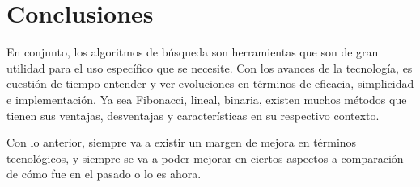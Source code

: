 \documentclass{article}
\begin{document}
\section{Conclusiones}

En conjunto, los algoritmos de búsqueda son herramientas que son de gran utilidad para el uso específico que se necesite. Con los avances de la tecnología, es cuestión de tiempo entender y ver evoluciones en términos de eficacia, simplicidad e implementación. Ya sea Fibonacci, lineal, binaria, existen muchos métodos que tienen sus ventajas, desventajas y características en su respectivo contexto.

Con lo anterior, siempre va a existir un margen de mejora en términos tecnológicos, y siempre se va a poder mejorar en ciertos aspectos a comparación de cómo fue en el pasado o lo es ahora.




\end{document}
